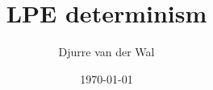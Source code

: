 \documentclass{report}%
\begin{document}
\title{LPE determinism}
\author{Djurre van der Wal}
\date{\today}
\maketitle
\tableofcontents






\end{document}
